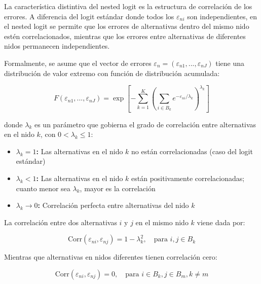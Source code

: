 \documentclass[
]{book}
\providecommand{\tightlist}{%
  \setlength{\itemsep}{0pt}\setlength{\parskip}{0pt}}
\begin{document}
La característica distintiva del nested logit es la estructura de correlación de los errores. A diferencia del logit estándar donde todos los \(\varepsilon_{ni}\) son independientes, en el nested logit se permite que los errores de alternativas dentro del mismo nido estén correlacionados, mientras que los errores entre alternativas de diferentes nidos permanecen independientes.

Formalmente, se asume que el vector de errores \(\varepsilon_n = (\varepsilon_{n1}, ..., \varepsilon_{nJ})\) tiene una distribución de valor extremo con función de distribución acumulada:

\begin{equation}
F(\varepsilon_{n1}, ..., \varepsilon_{nJ}) = \exp\left[-\sum_{k=1}^K \left(\sum_{i \in B_k} e^{-\varepsilon_{ni}/\lambda_k}\right)^{\lambda_k}\right]
\label{eq:gevdist}
\end{equation}

donde \(\lambda_k\) es un parámetro que gobierna el grado de correlación entre alternativas en el nido \(k\), con \(0 < \lambda_k \leq 1\):

\begin{itemize}
\tightlist
\item
  \textbf{\(\lambda_k = 1\):} Las alternativas en el nido \(k\) no están correlacionadas (caso del logit estándar)
\item
  \textbf{\(\lambda_k < 1\):} Las alternativas en el nido \(k\) están positivamente correlacionadas; cuanto menor sea \(\lambda_k\), mayor es la correlación
\item
  \textbf{\(\lambda_k \to 0\):} Correlación perfecta entre alternativas del nido \(k\)
\end{itemize}

La correlación entre dos alternativas \(i\) y \(j\) en el mismo nido \(k\) viene dada por:

\begin{equation}
\text{Corr}(\varepsilon_{ni}, \varepsilon_{nj}) = 1 - \lambda_k^2, \quad \text{para } i, j \in B_k
\label{eq:corrwithin}
\end{equation}

Mientras que alternativas en nidos diferentes tienen correlación cero:

\begin{equation}
\text{Corr}(\varepsilon_{ni}, \varepsilon_{nj}) = 0, \quad \text{para } i \in B_k, j \in B_m, k \neq m
\label{eq:corrbetween}
\end{equation}
\end{document}
